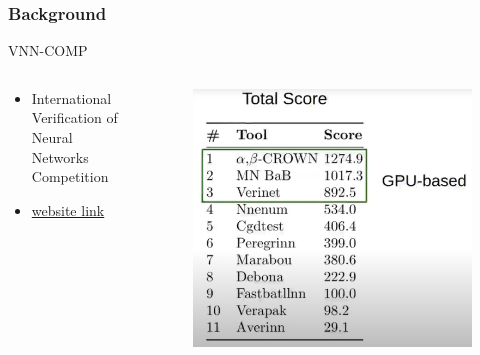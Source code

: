 \documentclass[aspectratio=169%
,serif,mathserif]{beamer}
\begin{document}
\begin{frame}
	\frametitle{Background}
	VNN-COMP
	\begin{columns}
		\begin{column}{.45\textwidth}
			\begin{itemize}
				\item International Verification of Neural Networks Competition
				\item \href{https://sites.google.com/view/vnn2022}{website link}	
			\end{itemize}
		\end{column}

		\begin{column}{.55\textwidth}
			\begin{figure}[htbp]
				\includegraphics[width=.65\linewidth]{1.png}
			\end{figure}
		\end{column}
	\end{columns}
\end{frame}



\end{document}
